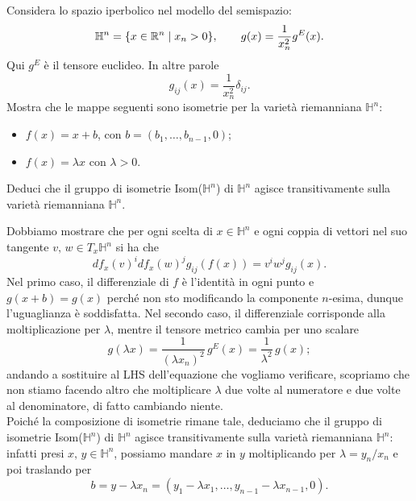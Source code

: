\documentclass[a4paper]{article}
\begin{document}
\begin{ex}[8.7]{Considera lo spazio iperbolico nel modello del semispazio:
	\[ \mathbb{H}^n = \{ x \in \mathbb{R}^n \mid x_n> 0 \}, \qquad g(x) = \frac{1}{x_n^2} g^E(x). \]
	Qui $ g^E $ è il tensore euclideo. In altre parole
	\[ g_{ij} (x) = \frac{1}{x_n^2}\delta_{ij}. \] 
	Mostra che le mappe seguenti sono isometrie per la varietà riemanniana $ \mathbb{H}^n $:
	\begin{itemize}
		\item[\textbullet] $ f (x) = x + b $, con $ b = (b_1, \dots , b_{n-1}, 0) $;
		\item[\textbullet] $ f (x) = \lambda x $ con $ \lambda > 0 $.
	\end{itemize}
	Deduci che il gruppo di isometrie Isom($ \mathbb{H}^n $) di $ \mathbb{H}^n $ agisce transitivamente sulla
	varietà riemanniana $ \mathbb{H}^n $.}
	
	Dobbiamo mostrare che per ogni scelta di $ x \in \mathbb{H}^n $ e ogni coppia di vettori nel suo tangente $ v, \, w \in T_x\mathbb{H}^n $ si ha che
	$$  df_x(v)^idf_x(w)^jg_{ij}(f(x)) = v^iw^jg_{ij}(x).  $$
	Nel primo caso, il differenziale di $ f $ è l'identità in ogni punto e $ g(x+b)=g(x) $ perché non sto modificando la componente $ n $-esima, dunque l'uguaglianza è soddisfatta.
	Nel secondo caso, il differenziale corrisponde alla moltiplicazione per $ \lambda $, mentre il tensore metrico cambia per uno scalare
	$$  g(\lambda x) = \frac{1}{(\lambda x_n)^2}\, g^E(x) = \frac{1}{\lambda^2}\, g(x);  $$
	andando a sostituire al LHS dell'equazione che vogliamo verificare, scopriamo che non stiamo facendo altro che moltiplicare $ \lambda $ due volte al numeratore e due volte al denominatore, di fatto cambiando niente.\\
	
	Poiché la composizione di isometrie rimane tale, deduciamo che il gruppo di isometrie Isom($ \mathbb{H}^n $) di $ \mathbb{H}^n $ agisce transitivamente sulla varietà riemanniana $ \mathbb{H}^n $: infatti presi $ x,\, y \in \mathbb{H}^n $, possiamo mandare $ x $ in $ y $ moltiplicando per $ \lambda = y_n/x_n $ e poi traslando per $$  b = y - \lambda x_n = (y_1-\lambda x_1, \dots, y_{n-1}-\lambda x_{n-1}, 0).  $$ 
\end{ex}
\end{document}
